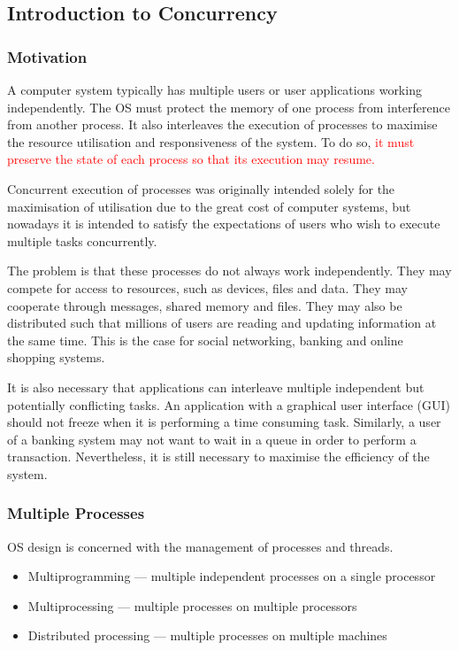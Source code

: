 \subsection{Introduction to Concurrency}

\subsubsection{Motivation}

A computer system typically has multiple users or user applications working independently.
The OS must protect the memory of one process from interference from another process.
It also interleaves the execution of processes to maximise the resource utilisation and responsiveness of the system.
To do so, \textcolor{red}{it must preserve the state of each process so that its execution may resume.}

Concurrent execution of processes was originally intended solely for the maximisation of utilisation due to the great cost of computer systems, but nowadays it is intended to satisfy the expectations of users who wish to execute multiple tasks concurrently.

The problem is that these processes do not always work independently.
They may compete for access to resources, such as devices, files and data.
They may cooperate through messages, shared memory and files.
They may also be distributed such that millions of users are reading and updating information at the same time.
This is the case for social networking, banking and online shopping systems.

It is also necessary that applications can interleave multiple independent but potentially conflicting tasks.
An application with a graphical user interface (GUI) should not freeze when it is performing a time consuming task.
Similarly, a user of a banking system may not want to wait in a queue in order to perform a transaction.
Nevertheless, it is still necessary to maximise the efficiency of the system.

\subsubsection{Multiple Processes}

OS design is concerned with the management of processes and threads.
\begin{itemize}
  \item Multiprogramming --- multiple independent processes on a single processor
  \item Multiprocessing --- multiple processes on multiple processors
  \item Distributed processing --- multiple processes on multiple machines
\end{itemize}

